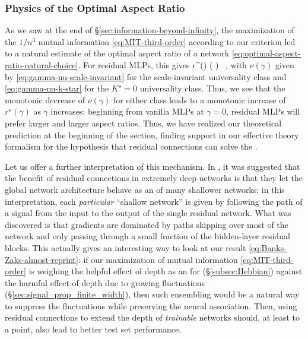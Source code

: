 \subsubsection{Physics of the Optimal Aspect Ratio}
As we saw at the end of \S\ref{sec:information-beyond-infinity}, the maximization of the $1/n^3$ mutual information \eqref{eq:MIT-third-order} according to our  criterion led to a natural estimate  of the optimal aspect ratio of a network \eqref{eq:optimal-aspect-ratio-natural-choice}. For residual MLPs, this gives
\be\label{eq:Banks-Zaks-almost-reprint}
r^{\star}(\gamma) \equiv \le( \ri) \, ,
\ee
with $\nu(\gamma)$ given by \eqref{eq:gamma-nu-scale-invariant} for the scale-invariant universality class and \eqref{eq:gamma-nu-k-star} for the $K^\star=0$ universality class. Thus, we see that the monotonic decrease of $\nu(\gamma)$ for either class leads to a monotonic increase of $r^{\star}(\gamma)$ as $\gamma$ increases: beginning from vanilla MLPs at $\gamma=0$, residual MLPs will prefer larger and larger aspect ratios.
Thus, we have realized our theoretical prediction at the beginning of the section, finding  support in our effective theory formalism for the hypothesis that residual connections can solve the .

Let us offer a further interpretation of this mechanism.
In \cite{resnet-as-ensemble}, it was suggested that %
the benefit of 
residual connections 
in extremely
deep networks 
is that 
they
let the global network architecture 
behave as an  of many shallower networks:
in this interpretation, each \emph{particular} ``shallow network'' is given by following the path of a signal from the input to the output of the single residual network.
What was discovered is that gradients are dominated by paths skipping over most of the network
 and only passing through a small fraction of the 
hidden-layer residual blocks. This actually gives an interesting way to look at our result \eqref{eq:Banks-Zaks-almost-reprint}: if our maximization of mutual information \eqref{eq:MIT-third-order} is weighing the helpful effect of depth %
as an  for
 (\S\ref{subsec:Hebbian}) against the harmful effect of depth due to growing fluctuations (\S\ref{sec:signal_prop_finite_width}), then such ensembling would be a natural way to suppress the fluctuations while preserving the neural association. Then, using residual connections to extend the depth of \emph{trainable} networks should, at least to a point, also lead to better test set performance.








